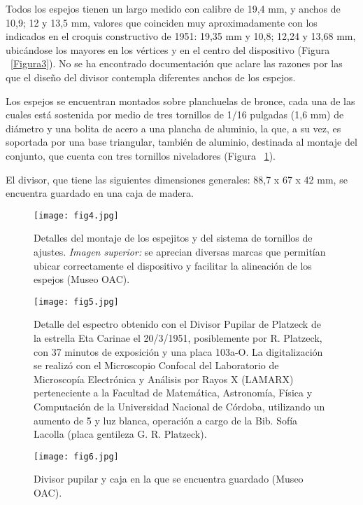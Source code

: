 \documentclass[baaa]{baaa}
\begin{document}
Todos los espejos tienen un largo medido con calibre de 19,4 mm, y anchos de 10,9; 12 y 13,5 mm, valores que coinciden muy aproximadamente con los indicados en el croquis constructivo de 1951: 19,35 mm y 10,8; 12,24 y 13,68 mm, ubicándose los mayores en los vértices y en el centro del dispositivo (Figura ~\ref{Figura3}). No se ha encontrado documentación que aclare las razones por las que el diseño del divisor contempla diferentes anchos de los espejos. 

Los espejos se encuentran montados sobre planchuelas de bronce, cada una de las cuales está sostenida por medio de tres tornillos de 1/16 pulgadas (1,6 mm) de diámetro y una bolita de acero a una plancha de aluminio, la que, a su vez, es soportada por una base triangular, también de aluminio, destinada al montaje del conjunto, que cuenta con tres tornillos niveladores (Figura ~\ref{Figura4}). 

El divisor, que tiene las siguientes dimensiones generales: 88,7 x 67 x 42 mm, se encuentra guardado en una caja de madera.
 
\begin{figure}[!t]
\centering
\texttt{[image: fig4.jpg]}
\caption{Detalles del montaje de los espejitos y del sistema de tornillos de ajustes. \emph{Imagen superior:} se aprecian diversas marcas que permitían ubicar correctamente el dispositivo y facilitar la alineación de los espejos (Museo OAC).}
\label{Figura4}
\end{figure}

\begin{figure*}[!t]
\centering
\texttt{[image: fig5.jpg]}
\caption{Detalle del espectro obtenido con el Divisor Pupilar de Platzeck de la estrella Eta Carinae el 20/3/1951, posiblemente por R. Platzeck, con 37 minutos de exposición y una placa 103a-O. La digitalización se realizó con el Microscopio Confocal del Laboratorio de Microscopía Electrónica y Análisis por Rayos X (LAMARX) perteneciente a la Facultad de Matemática, Astronomía, Física y Computación de la Universidad Nacional de Córdoba, utilizando un aumento de 5 y luz blanca, operación a cargo de la Bib. Sofía Lacolla (placa gentileza G. R. Platzeck).}
\label{Figura5}
\end{figure*}

\begin{figure}[!t]
\centering
\texttt{[image: fig6.jpg]}
\caption{Divisor pupilar y caja en la que se encuentra guardado (Museo OAC).}
\label{Figura6}
\end{figure}
\end{document}
